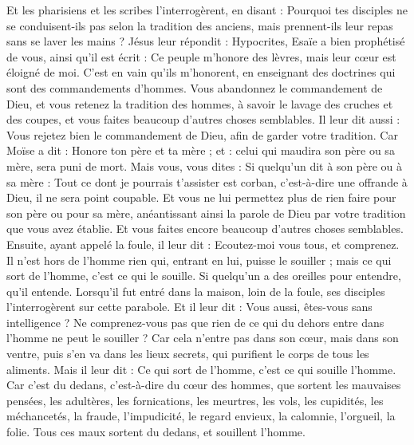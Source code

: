 \begin{multicols}{2}
Et les pharisiens et les scribes l'interrogèrent, en disant : Pourquoi tes disciples ne se conduisent-ils pas selon la tradition des anciens, mais prennent-ils leur repas sans se laver les mains ?
Jésus leur répondit : Hypocrites, Esaïe a bien prophétisé de vous, ainsi qu’il est écrit : Ce peuple m'honore des lèvres, mais leur cœur est éloigné de moi{}.
C’est en vain qu’ils m'honorent, en enseignant des doctrines qui sont des commandements d'hommes.
Vous abandonnez le commandement de Dieu, et vous retenez la tradition des hommes, à savoir le lavage des cruches et des coupes, et vous faites beaucoup d'autres choses semblables.
Il leur dit aussi : Vous rejetez bien le commandement de Dieu, afin de garder votre tradition.
Car Moïse a dit : Honore ton père et ta mère ; et : celui qui maudira son père ou sa mère, sera puni de mort.
Mais vous, vous dites : Si quelqu'un dit à son père ou à sa mère : Tout ce dont je pourrais t’assister est corban, c’est-à-dire une offrande à Dieu, il ne sera point coupable.
Et vous ne lui permettez plus de rien faire pour son père ou pour sa mère,
anéantissant ainsi la parole de Dieu par votre tradition que vous avez établie. Et vous faites encore beaucoup d’autres choses semblables.
Ensuite, ayant appelé la foule, il leur dit : Ecoutez-moi vous tous, et comprenez.
Il n’est hors de l’homme rien qui, entrant en lui, puisse le souiller ; mais ce qui sort de l’homme, c’est ce qui le souille.
Si quelqu'un a des oreilles pour entendre, qu'il entende.
Lorsqu’il fut entré dans la maison, loin de la foule, ses disciples l'interrogèrent sur cette parabole.
Et il leur dit : Vous aussi, êtes-vous sans intelligence ? Ne comprenez-vous pas que rien de ce qui du dehors entre dans l’homme ne peut le souiller ?
Car cela n'entre pas dans son cœur, mais dans son ventre, puis s’en va dans les lieux secrets, qui purifient le corps de tous les aliments.
Mais il leur dit : Ce qui sort de l'homme, c'est ce qui souille l'homme.
Car c’est du dedans, c'est-à-dire du cœur des hommes, que sortent les mauvaises pensées, les adultères, les fornications, les meurtres,
les vols, les cupidités, les méchancetés, la fraude, l'impudicité, le regard envieux, la calomnie, l’orgueil, la folie.
Tous ces maux sortent du dedans, et souillent l'homme.

\end{multicols}
